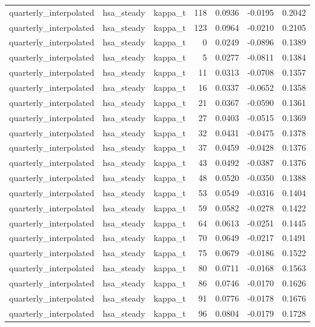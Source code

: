 \begin{tabular}{lllrrrr}
quarterly\_interpolated & hsa\_steady & kappa\_t & 118 & 0.0936 & -0.0195 & 0.2042 \\
quarterly\_interpolated & hsa\_steady & kappa\_t & 123 & 0.0964 & -0.0210 & 0.2105 \\
quarterly\_interpolated & hsa\_steady & kappa\_t & 0 & 0.0249 & -0.0896 & 0.1389 \\
quarterly\_interpolated & hsa\_steady & kappa\_t & 5 & 0.0277 & -0.0811 & 0.1384 \\
quarterly\_interpolated & hsa\_steady & kappa\_t & 11 & 0.0313 & -0.0708 & 0.1357 \\
quarterly\_interpolated & hsa\_steady & kappa\_t & 16 & 0.0337 & -0.0652 & 0.1358 \\
quarterly\_interpolated & hsa\_steady & kappa\_t & 21 & 0.0367 & -0.0590 & 0.1361 \\
quarterly\_interpolated & hsa\_steady & kappa\_t & 27 & 0.0403 & -0.0515 & 0.1369 \\
quarterly\_interpolated & hsa\_steady & kappa\_t & 32 & 0.0431 & -0.0475 & 0.1378 \\
quarterly\_interpolated & hsa\_steady & kappa\_t & 37 & 0.0459 & -0.0428 & 0.1376 \\
quarterly\_interpolated & hsa\_steady & kappa\_t & 43 & 0.0492 & -0.0387 & 0.1376 \\
quarterly\_interpolated & hsa\_steady & kappa\_t & 48 & 0.0520 & -0.0350 & 0.1388 \\
quarterly\_interpolated & hsa\_steady & kappa\_t & 53 & 0.0549 & -0.0316 & 0.1404 \\
quarterly\_interpolated & hsa\_steady & kappa\_t & 59 & 0.0582 & -0.0278 & 0.1422 \\
quarterly\_interpolated & hsa\_steady & kappa\_t & 64 & 0.0613 & -0.0251 & 0.1445 \\
quarterly\_interpolated & hsa\_steady & kappa\_t & 70 & 0.0649 & -0.0217 & 0.1491 \\
quarterly\_interpolated & hsa\_steady & kappa\_t & 75 & 0.0679 & -0.0186 & 0.1522 \\
quarterly\_interpolated & hsa\_steady & kappa\_t & 80 & 0.0711 & -0.0168 & 0.1563 \\
quarterly\_interpolated & hsa\_steady & kappa\_t & 86 & 0.0746 & -0.0170 & 0.1626 \\
quarterly\_interpolated & hsa\_steady & kappa\_t & 91 & 0.0776 & -0.0178 & 0.1676 \\
quarterly\_interpolated & hsa\_steady & kappa\_t & 96 & 0.0804 & -0.0179 & 0.1728 \\

\end{tabular}
